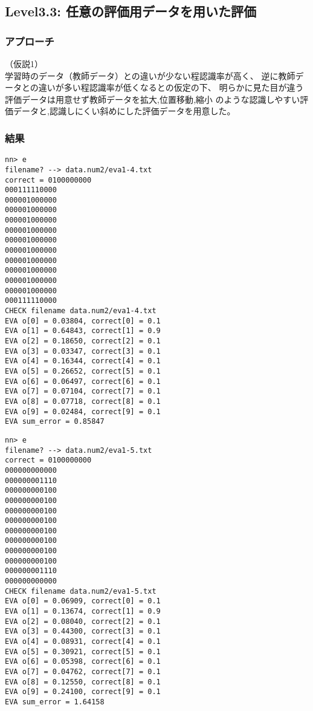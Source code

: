 \subsection{Level3.3: 任意の評価用データを用いた評価}
\subsubsection{アプローチ}

（仮説1）\\
学習時のデータ（教師データ）との違いが少ない程認識率が高く、
逆に教師データとの違いが多い程認識率が低くなるとの仮定の下、
明らかに見た目が違う評価データは用意せず教師データを拡大,位置移動,縮小
のような認識しやすい評価データと,認識しにくい斜めにした評価データを用意した。

\subsubsection{結果}

\begin{lstlisting}[caption=学習時のデータ拡大,label=ラベル]
nn> e
filename? --> data.num2/eva1-4.txt
correct = 0100000000
000111110000
000001000000
000001000000
000001000000
000001000000
000001000000
000001000000
000001000000
000001000000
000001000000
000001000000
000111110000
CHECK filename data.num2/eva1-4.txt
EVA o[0] = 0.03804, correct[0] = 0.1
EVA o[1] = 0.64843, correct[1] = 0.9
EVA o[2] = 0.18650, correct[2] = 0.1
EVA o[3] = 0.03347, correct[3] = 0.1
EVA o[4] = 0.16344, correct[4] = 0.1
EVA o[5] = 0.26652, correct[5] = 0.1
EVA o[6] = 0.06497, correct[6] = 0.1
EVA o[7] = 0.07104, correct[7] = 0.1
EVA o[8] = 0.07718, correct[8] = 0.1
EVA o[9] = 0.02484, correct[9] = 0.1
EVA sum_error = 0.85847
\end{lstlisting}


\begin{lstlisting}[caption=学習時のデータ位置移動,label=ラベル]
nn> e
filename? --> data.num2/eva1-5.txt
correct = 0100000000
000000000000
000000001110
000000000100
000000000100
000000000100
000000000100
000000000100
000000000100
000000000100
000000000100
000000001110
000000000000
CHECK filename data.num2/eva1-5.txt
EVA o[0] = 0.06909, correct[0] = 0.1
EVA o[1] = 0.13674, correct[1] = 0.9
EVA o[2] = 0.08040, correct[2] = 0.1
EVA o[3] = 0.44300, correct[3] = 0.1
EVA o[4] = 0.08931, correct[4] = 0.1
EVA o[5] = 0.30921, correct[5] = 0.1
EVA o[6] = 0.05398, correct[6] = 0.1
EVA o[7] = 0.04762, correct[7] = 0.1
EVA o[8] = 0.12550, correct[8] = 0.1
EVA o[9] = 0.24100, correct[9] = 0.1
EVA sum_error = 1.64158
\end{lstlisting}


